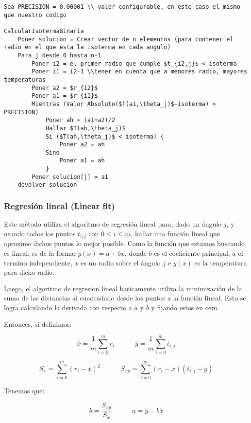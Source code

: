 \begin{lstlisting}[mathescape=true]
Sea PRECISION = 0.00001 \\ valor configurable, en este caso el mismo que nuestro codigo

CalcularIsotermaBinaria
    Poner solucion = Crear vector de n elementos (para contener el radio en el que esta la isoterma en cada angulo)
    Para j desde 0 hasta n-1
        Poner i2 = el primer radio que cumple $t_{i2,j}$ < isoterma
        Poner i1 = i2-1 \\tener en cuenta que a menores radio, mayores temperaturas
        Poner a2 = $r_{i2}$
        Poner a1 = $r_{i1}$
        Mientras (Valor Absoluto($T(a1,\theta_j)$-isoterma) > PRECISION)
            Poner ah = (a1+a2)/2
            Hallar $T(ah,\theta_j)$
            Si ($T(ah,\theta_j)$ < isoterma) {
                Poner a2 = ah
            Sino
                Poner a1 = ah
            }
        Poner solucion[j] = a1
    devolver solucion
\end{lstlisting}


\subsubsection{Regresión lineal (Linear fit)}

Este método utiliza el algoritmo de regresión lineal para, dado un ángulo $j$, y usando todos los puntos $t_{i,j}$ con $0 \leq i \leq m$, hallar una función lineal que aproxime dichos puntos lo mejor posible.
Como la función que estamos buscando es lineal, es de la forma: $y(x) = a + bx$, donde $b$ es el coeficiente principal, $a$ el termino independiente, $x$ es un radio sobre el ángulo $j$ e $y(x)$ es la temperatura para dicho radio.

Luego, el algoritmo de regresion lineal basicamente utiliza la minimización de la suma de las distancias al cuadradado desde los puntos a la función lineal. Esto se logra calculando la derivada con respecto a $a$ y $b$ y fijando estos en cero.

Entonces, si definimos:

$$\overline{x} = \frac{1}{m}\sum_{i=0}^{m}{r_i} \quad\quad\quad \overline{y} = \frac{1}{m}\sum_{i=0}^{m}{t_{i,j}}$$

$$S_x = \sum_{i=0}^{m}{(r_i - \overline{x})^2} \quad\quad\quad S_{xy} = \sum_{i=0}^{m}{(r_i - \overline{x})(t_{i,j} - \overline{y})}$$

Tenemos que:

$$b = \frac{S_{xy}}{S_x}  \quad\quad\quad a = \overline{y} - b\overline{x}$$

